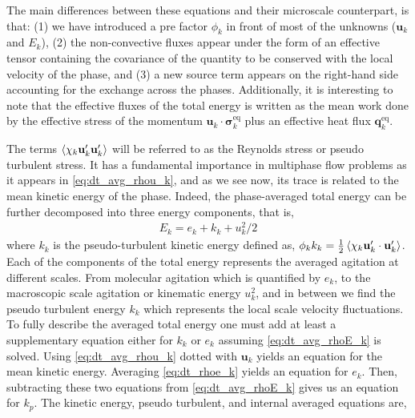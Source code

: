 The main differences between these equations and their microscale counterpart, is that: 
(1) we have introduced a pre factor $\phi_k$ in front of most of the unknowns  ($\textbf{u}_k$ and $E_k$), 
(2) the non-convective fluxes appear under the form of an effective tensor containing the covariance of the quantity to be conserved with the local velocity of the phase, 
and (3) a new source term appears on the right-hand side accounting for the exchange across the phases. 
Additionally, it is interesting to note that the effective fluxes of the total energy is written as the mean work done by the effective stress of the momentum $\textbf{u}_k \cdot \bm{\sigma}_k^\text{eq}$ plus an effective heat flux $\bm{q}_k^\text{eq}$. 

The terms $\left<\chi_k \textbf{u}_k'\textbf{u}_k'\right>$ will be referred to as the Reynolds stress or pseudo turbulent stress. 
It has a fundamental importance in multiphase flow problems as it appears in \ref{eq:dt_avg_rhou_k}, and as we see now, its trace is related to the mean kinetic energy of the phase. 
Indeed, the phase-averaged total energy can be further decomposed into three energy components, that is,  
\begin{align}
    E_k = e_k + k_k + u_k^2/2
    \label{eq:E_def2}
\end{align}
where $k_k$ is the pseudo-turbulent kinetic energy defined as, $\phi_k k_k = \frac{1}{2}\left<\chi_k \textbf{u}_k'\cdot \textbf{u}_k'\right>$. 
Each of the components of the total energy represents the averaged agitation at different scales. 
From molecular agitation which is quantified by $e_k$, to the macroscopic scale agitation or kinematic energy $u_k^2$, and in between we find the pseudo turbulent energy $k_k$ which represents the local scale velocity fluctuations. 
To fully describe the averaged total energy one must add at least a supplementary equation either for $k_k$ or $e_k$ assuming \ref{eq:dt_avg_rhoE_k} is solved. 
Using \ref{eq:dt_avg_rhou_k} dotted with $\textbf{u}_k$ yields an equation for the mean kinetic energy. 
Averaging \ref{eq:dt_rhoe_k} yields an equation for $e_k$.  
Then, subtracting these two equations from \ref{eq:dt_avg_rhoE_k} gives us an equation for $k_p$. 
The kinetic energy, pseudo turbulent, and internal averaged equations are, 
